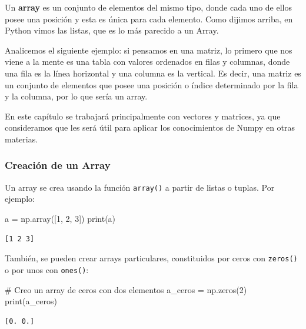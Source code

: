 \documentclass[
  letterpaper,
  DIV=11,
  numbers=noendperiod]{scrreprt}
\newenvironment{Shaded}{\begin{snugshade}}{\end{snugshade}}
\newcommand{\BuiltInTok}[1]{\textcolor[rgb]{0.00,0.23,0.31}{#1}}
\newcommand{\CommentTok}[1]{\textcolor[rgb]{0.37,0.37,0.37}{#1}}
\newcommand{\DecValTok}[1]{\textcolor[rgb]{0.68,0.00,0.00}{#1}}
\newcommand{\NormalTok}[1]{\textcolor[rgb]{0.00,0.23,0.31}{#1}}
\newcommand{\OperatorTok}[1]{\textcolor[rgb]{0.37,0.37,0.37}{#1}}
\begin{document}
Un \textbf{array} es un conjunto de elementos del mismo tipo, donde cada
uno de ellos posee una posición y esta es única para cada elemento. Como
dijimos arriba, en Python vimos las listas, que es lo más parecido a un
Array.

Analicemos el siguiente ejemplo: si pensamos en una matriz, lo primero
que nos viene a la mente es una tabla con valores ordenados en filas y
columnas, donde una fila es la línea horizontal y una columna es la
vertical. Es decir, una matriz es un conjunto de elementos que posee una
posición o índice determinado por la fila y la columna, por lo que sería
un array.

En este capítulo se trabajará principalmente con vectores y matrices, ya
que consideramos que les será útil para aplicar los conocimientos de
Numpy en otras materias.

\subsubsection{Creación de un Array}\label{creaciuxf3n-de-un-array}

Un array se crea usando la función \texttt{array()} a partir de listas o
tuplas. Por ejemplo:

\begin{Shaded}
\begin{Highlighting}[]
\NormalTok{a }\OperatorTok{=}\NormalTok{ np.array([}\DecValTok{1}\NormalTok{, }\DecValTok{2}\NormalTok{, }\DecValTok{3}\NormalTok{])}
\BuiltInTok{print}\NormalTok{(a)}
\end{Highlighting}
\end{Shaded}

\begin{verbatim}
[1 2 3]
\end{verbatim}

También, se pueden crear arrays particulares, constituidos por ceros con
\texttt{zeros()} o por unos con \texttt{ones()}:

\begin{Shaded}
\begin{Highlighting}[]
\CommentTok{\# Creo un array de ceros con dos elementos}
\NormalTok{a\_ceros }\OperatorTok{=}\NormalTok{ np.zeros(}\DecValTok{2}\NormalTok{)}
\BuiltInTok{print}\NormalTok{(a\_ceros)}
\end{Highlighting}
\end{Shaded}

\begin{verbatim}
[0. 0.]
\end{verbatim}
\end{document}
